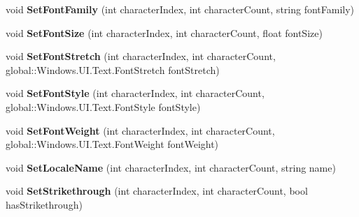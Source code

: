 \begin{DoxyCompactItemize}
void {\bfseries Set\+Font\+Family} (int character\+Index, int character\+Count, string font\+Family)
\item 
\mbox{\label{interface_microsoft_1_1_graphics_1_1_canvas_1_1_text_1_1_i_canvas_text_layout_a8b0dd44121dd43e004f96f5df2498994}} 
void {\bfseries Set\+Font\+Size} (int character\+Index, int character\+Count, float font\+Size)
\item 
\mbox{\label{interface_microsoft_1_1_graphics_1_1_canvas_1_1_text_1_1_i_canvas_text_layout_a516ffa415e1689e878df56a857176c9a}} 
void {\bfseries Set\+Font\+Stretch} (int character\+Index, int character\+Count, global\+::\+Windows.\+U\+I.\+Text.\+Font\+Stretch font\+Stretch)
\item 
\mbox{\label{interface_microsoft_1_1_graphics_1_1_canvas_1_1_text_1_1_i_canvas_text_layout_a6d809f3be58dcdf67400baee7baa91dc}} 
void {\bfseries Set\+Font\+Style} (int character\+Index, int character\+Count, global\+::\+Windows.\+U\+I.\+Text.\+Font\+Style font\+Style)
\item 
\mbox{\label{interface_microsoft_1_1_graphics_1_1_canvas_1_1_text_1_1_i_canvas_text_layout_aa79822a15fdf118523f58709bb123fc4}} 
void {\bfseries Set\+Font\+Weight} (int character\+Index, int character\+Count, global\+::\+Windows.\+U\+I.\+Text.\+Font\+Weight font\+Weight)
\item 
\mbox{\label{interface_microsoft_1_1_graphics_1_1_canvas_1_1_text_1_1_i_canvas_text_layout_a3ae7da339881c3d01eebeec801a99775}} 
void {\bfseries Set\+Locale\+Name} (int character\+Index, int character\+Count, string name)
\item 
\mbox{\label{interface_microsoft_1_1_graphics_1_1_canvas_1_1_text_1_1_i_canvas_text_layout_adf262145bc6d14b65076e7bb974b82d4}} 
void {\bfseries Set\+Strikethrough} (int character\+Index, int character\+Count, bool has\+Strikethrough)

\end{DoxyCompactItemize}
